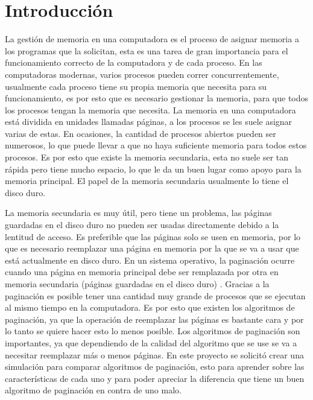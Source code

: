 \documentclass{report}
\begin{document}


\tableofcontents

\chapter{Introducción}\label{intro}
La gestión de memoria en una computadora es el proceso de asignar memoria a los programas que la solicitan, esta es una tarea de gran importancia para el funcionamiento correcto de la computadora y de cada proceso\cite{ref3}.
En las computadoras modernas, varios procesos pueden correr concurrentemente, usualmente cada proceso tiene su propia memoria que necesita para su funcionamiento, es por esto que es necesario gestionar la memoria, para que todos los procesos tengan la memoria que necesita. La memoria en una computadora está dividida en unidades llamadas páginas, a los procesos se les suele asignar varias de estas.
En ocasiones, la cantidad de procesos abiertos pueden ser numerosos, lo que puede llevar a que no haya suficiente memoria para todos estos procesos. 
Es por esto que existe la memoria secundaria, esta no suele ser tan rápida pero tiene mucho espacio, lo que le da un buen lugar como apoyo para la memoria principal.
El papel de la memoria secundaria usualmente lo tiene  el disco duro.

La memoria secundaria es muy útil, pero tiene un problema, las páginas guardadas en el disco duro no pueden ser usadas directamente debido a la lentitud de acceso. 
Es preferible que las páginas solo se usen en memoria, por lo que es necesario reemplazar una página en memoria por la que se va a usar que está actualmente en disco duro.
En un sistema operativo, la paginación ocurre cuando una página en memoria principal debe ser remplazada por otra en memoria secundaria (páginas guardadas en el disco duro) \cite{ref2}. 
Gracias a la paginación es posible tener una cantidad muy grande de procesos que se ejecutan al mismo tiempo en la computadora.
Es por esto que existen los algoritmos de paginación, ya que la operación de reemplazar las páginas es bastante cara y por lo tanto se quiere hacer esto lo menos posible.
Los algoritmos de paginación son importantes, ya que dependiendo de la calidad del algoritmo que se use se va a necesitar reemplazar más o menos páginas.
En este proyecto se solicitó crear una simulación para comparar algoritmos de paginación, esto para aprender sobre las características de cada uno y para poder apreciar la diferencia que tiene un buen algoritmo de paginación en contra de uno malo. \\
\end{document}
